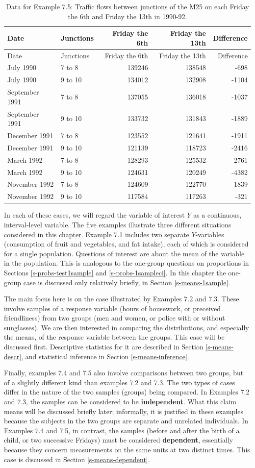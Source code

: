 \documentclass[11pt,a4paper,openany]{book}
\begin{document}
\begin{longtable}[]{@{}llrrr@{}}
\caption{\label{tab:t-F13} Data for Example 7.5: Traffic flows between
junctions of the M25 on each Friday the 6th and Friday the 13th in
1990-92.}\tabularnewline
\toprule
Date & Junctions & Friday the 6th & Friday the 13th &
Difference\tabularnewline
\midrule
\endfirsthead
\toprule
Date & Junctions & Friday the 6th & Friday the 13th &
Difference\tabularnewline
\midrule
\endhead
July 1990 & 7 to 8 & 139246 & 138548 & -698\tabularnewline
July 1990 & 9 to 10 & 134012 & 132908 & -1104\tabularnewline
September 1991 & 7 to 8 & 137055 & 136018 & -1037\tabularnewline
September 1991 & 9 to 10 & 133732 & 131843 & -1889\tabularnewline
December 1991 & 7 to 8 & 123552 & 121641 & -1911\tabularnewline
December 1991 & 9 to 10 & 121139 & 118723 & -2416\tabularnewline
March 1992 & 7 to 8 & 128293 & 125532 & -2761\tabularnewline
March 1992 & 9 to 10 & 124631 & 120249 & -4382\tabularnewline
November 1992 & 7 to 8 & 124609 & 122770 & -1839\tabularnewline
November 1992 & 9 to 10 & 117584 & 117263 & -321\tabularnewline
\bottomrule
\end{longtable}

In each of these cases, we will regard the variable of interest \(Y\) as
a continuous, interval-level variable. The five examples illustrate
three different situations considered in this chapter. Example 7.1
includes two separate \(Y\)-variables (consumption of fruit and
vegetables, and fat intake), each of which is considered for a single
population. Questions of interest are about the mean of the variable in
the population. This is analogous to the one-group questions on
proportions in Sections \ref{s-probs-test1sample} and
\ref{s-probs-1sampleci}. In this chapter the one-group case is discussed
only relatively briefly, in Section \ref{s-means-1sample}.

The main focus here is on the case illustrated by Examples 7.2 and 7.3.
These involve samples of a response variable (hours of housework, or
preceived friendliness) from two groups (men and women, or police with
or without sunglasses). We are then interested in comparing the
distributions, and especially the means, of the response variable
between the groups. This case will be discussed first. Descriptive
statistics for it are described in Section \ref{s-means-descr}, and
statistical inference in Section \ref{s-means-inference}.

Finally, examples 7.4 and 7.5 also involve comparisons between two
groups, but of a slightly different kind than examples 7.2 and 7.3. The
two types of cases differ in the nature of the two samples (groups)
being compared. \label{p-depsamples} In Examples 7.2 and 7.3, the
samples can be considered to be \textbf{independent}. What this claim
means will be discussed briefly later; informally, it is justified in
these examples because the subjects in the two groups are separate and
unrelated individuals. In Examples 7.4 and 7.5, in contrast, the samples
(before and after the birth of a child, or two successive Fridays) must
be considered \textbf{dependent}, essentially because they concern
measurements on the same units at two distinct times. This case is
discussed in Section \ref{s-means-dependent}.
\end{document}
